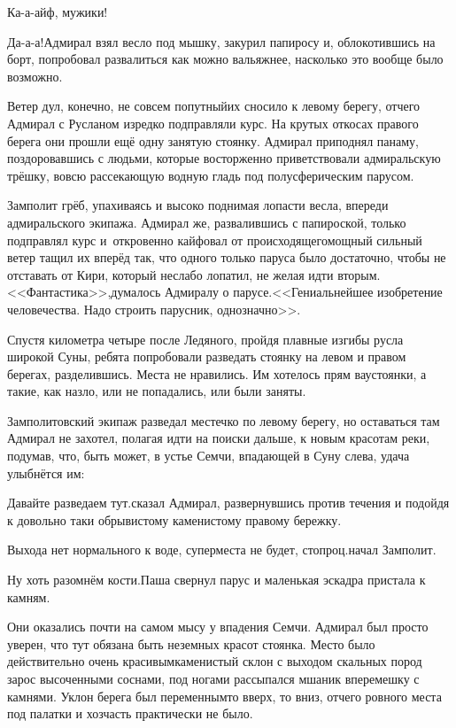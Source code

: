 \diagdash Ка-а-айф, мужики!

\diagdash Да-а-а!\mdash Адмирал взял весло под мышку, закурил папиросу и, облокотившись на борт, попробовал развалиться как можно вальяжнее, насколько это вообще было возможно. 

Ветер дул, конечно, не совсем попутный\mdash их сносило к левому берегу, отчего Адмирал с Русланом изредко подправляли курс. На крутых откосах правого берега они прошли ещё одну занятую стоянку. Адмирал приподнял панаму, поздоровавшись с людьми, которые восторженно приветствовали адмиральскую трёшку, вовсю рассекающую водную гладь под полусферическим парусом.

Замполит грёб, упахиваясь и высоко поднимая лопасти весла, впереди адмиральского экипажа. Адмирал же, развалившись с папироской, только подправлял курс и~откровенно кайфовал от происходящего\mdash мощный сильный ветер тащил их вперёд так, что одного только паруса было достаточно, чтобы не отставать от Кири, который неслабо лопатил, не желая идти вторым. <<Фантастика>>,\mdash думалось Адмиралу о парусе.\mdash<<Гениальнейшее изобретение человечества. Надо строить парусник, однозначно>>.

Спустя километра четыре после Ледяного, пройдя плавные изгибы русла широкой Суны, ребята попробовали разведать стоянку на левом и правом берегах, разделившись. Места не нравились. Им хотелось прям вау\sdash стоянки, а такие, как назло, или не попадались, или были заняты.

Замполитовский экипаж разведал местечко по левому берегу, но оставаться там Адмирал не захотел, полагая идти на поиски дальше, к новым красотам реки, подумав, что, быть может, в устье Семчи, впадающей в Суну слева, удача улыбнётся им:

\diagdash Давайте разведаем тут.\mdash сказал Адмирал, развернувшись против течения и подойдя к довольно таки обрывистому каменистому правому бережку.

\diagdash Выхода нет нормального к воде, супер\sdash места не будет, стопроц.\mdash начал Замполит.

\diagdash Ну хоть разомнём кости.\mdash Паша свернул парус и маленькая эскадра пристала к камням.

Они оказались почти на самом мысу у впадения Семчи. Адмирал был просто уверен, что тут обязана быть неземных красот стоянка. Место было действительно очень красивым\mdash каменистый склон с выходом скальных пород зарос высоченными соснами, под ногами рассыпался мшаник вперемешку с камнями. Уклон берега был переменным\mdash то вверх, то вниз, отчего ровного места под палатки и хозчасть практически не было.

